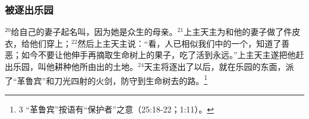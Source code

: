 \subsubsection{被逐出乐园}
$^{20}$\UL[亚当]给自己的妻子起名叫\UL[厄娃]，因为她是众生的母亲。$^{21}$上主天主为\UL[亚当]和他的妻子做了件皮衣，给他们穿上；$^{22}$然后上主天主说：“看，人已相似我们中的一个，知道了善恶；如今不要让他伸手再摘取生命树上的果子，吃了活到永远。”上主天主遂把他赶出\UL[伊甸]乐园，叫他耕种他所由出的土地。$^{24}$天主将\UL[亚当]逐出了以后，就在\UL[伊甸]乐园的东面，派了“革鲁宾”和刀光四射的火剑，防守到生命树去的路。\footnote{3 “革鲁宾”按\UL[巴比伦]语有“保护者”之意（25:18-22；1:11）。}


